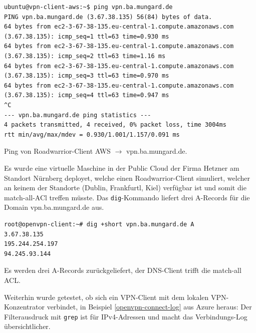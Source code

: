 \begin{listing}[h]
\begin{verbatim}
ubuntu@vpn-client-aws:~$ ping vpn.ba.mungard.de
PING vpn.ba.mungard.de (3.67.38.135) 56(84) bytes of data.
64 bytes from ec2-3-67-38-135.eu-central-1.compute.amazonaws.com (3.67.38.135): icmp_seq=1 ttl=63 time=0.930 ms
64 bytes from ec2-3-67-38-135.eu-central-1.compute.amazonaws.com (3.67.38.135): icmp_seq=2 ttl=63 time=1.16 ms
64 bytes from ec2-3-67-38-135.eu-central-1.compute.amazonaws.com (3.67.38.135): icmp_seq=3 ttl=63 time=0.970 ms
64 bytes from ec2-3-67-38-135.eu-central-1.compute.amazonaws.com (3.67.38.135): icmp_seq=4 ttl=63 time=0.947 ms
^C
--- vpn.ba.mungard.de ping statistics ---
4 packets transmitted, 4 received, 0% packet loss, time 3004ms
rtt min/avg/max/mdev = 0.930/1.001/1.157/0.091 ms

\end{verbatim}
\caption{Ping von Roadwarrior-Client AWS $\rightarrow$ vpn.ba.mungard.de.}
\label{ping-aws-ip}
\end{listing}\FloatBarrier
Es wurde eine virtuelle Maschine in der Public Cloud der Firma Hetzner am Standort Nürnberg deployet, welche einen Roadwarrior-Client simuliert, welcher an keinem der Standorte (Dublin, Frankfurtl, Kiel) verfügbar ist und somit die \glqq match-all\grqq-ACl treffen müsste. Das \texttt{dig}-Kommando liefert drei A-Records für die Domain vpn.ba.mungard.de aus.
\begin{listing}[h]
\begin{verbatim}
root@openvpn-client:~# dig +short vpn.ba.mungard.de A
3.67.38.135
195.244.254.197
94.245.93.144

\end{verbatim}
\caption{Es werden drei A-Records zurückgeliefert, der DNS-Client trifft die match-all ACL.}
\label{dig-match-all}
\end{listing}\FloatBarrier
\newpage
Weiterhin wurde getestet, ob sich ein VPN-Client mit dem lokalen VPN-Konzentrator verbindet, in Beispiel \ref{openvpn-connect-log} aus Azure heraus:
Der Filterausdruck mit \texttt{grep} ist für IPv4-Adressen und macht das Verbindungs-Log übersichtlicher.
